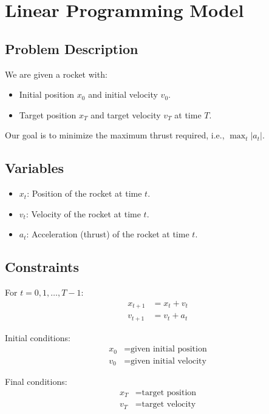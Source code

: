 \documentclass{article}
\begin{document}
\section*{Linear Programming Model}

\subsection*{Problem Description}

We are given a rocket with:
\begin{itemize}
    \item Initial position \( x_0 \) and initial velocity \( v_0 \).
    \item Target position \( x_T \) and target velocity \( v_T \) at time \( T \).
\end{itemize}

Our goal is to minimize the maximum thrust required, i.e., \( \max_t |a_t| \).

\subsection*{Variables}

\begin{itemize}
    \item \( x_t \): Position of the rocket at time \( t \).
    \item \( v_t \): Velocity of the rocket at time \( t \).
    \item \( a_t \): Acceleration (thrust) of the rocket at time \( t \).
\end{itemize}

\subsection*{Constraints}

For \( t = 0, 1, \ldots, T-1 \):
\begin{align}
    x_{t+1} &= x_t + v_t \\
    v_{t+1} &= v_t + a_t
\end{align}

Initial conditions:
\begin{align}
    x_0 &= \text{given initial position} \\
    v_0 &= \text{given initial velocity}
\end{align}

Final conditions:
\begin{align}
    x_T &= \text{target position} \\
    v_T &= \text{target velocity}
\end{align}
\end{document}
